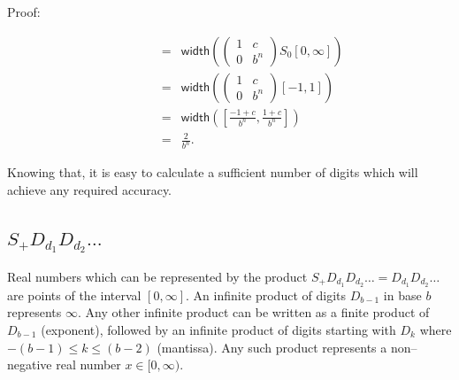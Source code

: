 \documentclass[11pt,a4paper]{article}
\newenvironment{proof}
	{ \begin{description} \item[Proof:] \footnotesize }
	{ \end{description} }
\begin{document}
\begin{proof}
\[\begin{array}{rcl}
			&=& \textsf{width} \left( \begin{pmatrix} 1&c\\0&b^n
			\end{pmatrix} S_0 [0,\infty] \right) \\
		&=& \textsf{width} \left(
			\begin{pmatrix} 1&c\\0&b^n \end{pmatrix} [-1,1] \right) \\
		&=& \displaystyle{ \textsf{width} \left(
			\left[ \frac{-1+c}{b^n}, \frac{1+c}{b^n} \right] \right) } \\
		&=& \displaystyle{ \frac{2}{b^n} }.
	\end{array} \]
	\end{proof}
	Knowing that, it is easy to calculate a sufficient number of digits
	which will achieve any required accuracy.


\subsection{$S_+ D_{d_1} D_{d_2} \ldots$} \label{subsection spos}
Real numbers which can be represented by the product $S_+ D_{d_1}
	D_{d_2} \ldots = D_{d_1} D_{d_2} \ldots$ are points of the
	interval $[0,\infty]$. An infinite product of digits $D_{b-1}$ in
	base $b$ represents $\infty$. Any other infinite product
	can be written as a finite product of $D_{b-1}$ (exponent), followed
	by an infinite product of digits starting with $D_k$ where $-(b-1)
	\le k \le (b-2)$ (mantissa). Any such product represents a
	non--negative real number $x \in [0,\infty)$.
\end{document}
